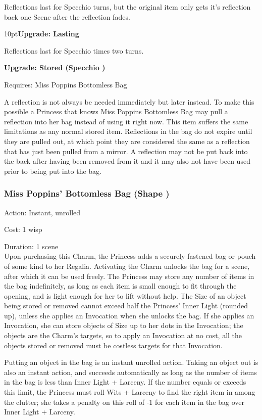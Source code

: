 Reflections last for Specchio turns, but the original item only gets it's reflection back one Scene after the reflection fades.
\begin{myindentpar}{10pt}\textbf{Upgrade: Lasting}

Reflections last for Specchio times two turns.

\textbf{Upgrade: Stored (Specchio \textbullet\textbullet)}

\noindent Requires: Miss Poppins Bottomless Bag

A reflection is not always be needed immediately but later instead. To make this possible a Princess that knows Miss Poppins Bottomless Bag may pull a reflection into her bag instead of using it right now. This item suffers the same limitations as any normal stored item. Reflections in the bag do not expire until they are pulled out, at which point they are considered the same as a reflection that has just been pulled from a mirror. A reflection may not be put back into the back after having been removed from it and it may also not have been used prior to being put into the bag.\end{myindentpar}

\subsubsection*{Miss Poppins' Bottomless Bag (Shape \textbullet\textbullet)}

\noindent Action: Instant, unrolled

\noindent Cost: 1 wisp

\noindent Duration: 1 scene \\

\noindent Upon purchasing this Charm, the Princess adds a securely fastened bag or pouch of some kind to her Regalia. Activating the Charm unlocks the bag for a scene, after which it can be used freely. The Princess may store any number of items in the bag indefinitely, as long as each item is small enough to fit through the opening, and is light enough for her to lift without help. The Size of an object being stored or removed cannot exceed half the Princess' Inner Light (rounded up), unless she applies an Invocation when she unlocks the bag. If she applies an Invocation, she can store objects of Size up to her dots in the Invocation; the objects are the Charm's targets, so to apply an Invocation at no cost, all the objects stored or removed must be costless targets for that Invocation.

Putting an object in the bag is an instant unrolled action. Taking an object out is also an instant action, and succeeds automatically as long as the number of items in the bag is less than Inner Light + Larceny. If the number equals or exceeds this limit, the Princess must roll Wits + Larceny to find the right item in among the clutter; she takes a penalty on this roll of -1 for each item in the bag over Inner Light + Larceny.

